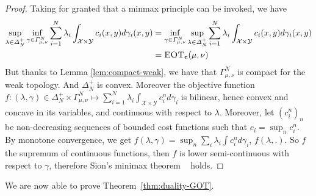 \begin{proof}
Taking for granted that a minmax principle can be invoked, we have
\begin{align*}
    \sup_{\lambda\in\Delta_N^{+}}\inf_{\gamma\in\Gamma_{\mu,\nu}^N} \sum_{i=1}^N\lambda_i\int_{\mathcal{X}\times\mathcal{Y}}c_i(x,y)d\gamma_i(x,y) &= \inf_{\gamma\in\Gamma_{\mu,\nu}^N}\sup_{\lambda\in \Delta_N^{+}} \sum_{i=1}^N\lambda_i\int_{\mathcal{X}\times\mathcal{Y}}c_i(x,y)d\gamma_i(x,y)\\
    &=\textsc{EOT}_{\mathbf{c}}(\mu,\nu)
\end{align*}
But thanks to Lemma \ref{lem:compact-weak}, we have that $\Gamma_{\mu,\nu}^N$ is compact for the weak topology. And $\Delta^+_N$ is convex. Moreover the objective function $f:(\lambda,\gamma)\in\Delta^+_N\times\Gamma^N_{\mu,\nu} \mapsto \sum_{i=1}^N\lambda_i \int_{\mathcal{X}\times \mathcal{Y}} c^n_id\gamma_i$ is bilinear, hence convex and concave  in its variables, and continuous with respect to $\lambda$. Moreover, let $(c^n_i)_n$ be non-decreasing sequences of bounded cost functions such that $c_i=\sup_n c^n_i$. By monotone convergence, we get $f(\lambda,\gamma) = \sup_n \sum_i\lambda_i \int c^n_i d\gamma_i$, $f(\lambda,.)$. So $f$ the supremum of continuous functions, then $f$ is lower semi-continuous with respect to $\gamma$, therefore Sion's minimax theorem
~\citep{sion1958} holds.

\end{proof}

We are now able to prove Theorem~\ref{thm:duality-GOT}.

